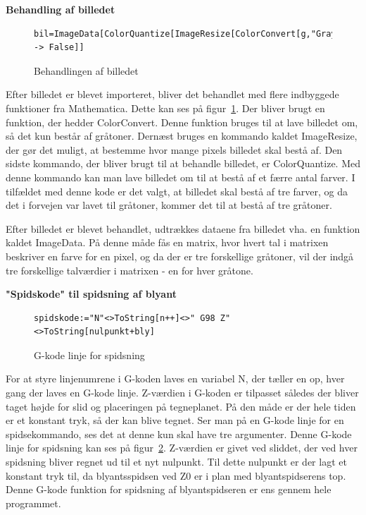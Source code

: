 \textbf{Behandling af billedet}\\
\begin{figure}[h]
	\begin{lstlisting}
bil=ImageData[ColorQuantize[ImageResize[ColorConvert[g,"Grayscale"],a],3,Dithering -> False]]
\end{lstlisting}
	\caption{Behandlingen af billedet}
	\label{fig:bil}
	\end{figure}
Efter billedet er blevet importeret, bliver det behandlet med flere indbyggede funktioner fra Mathematica. Dette kan ses på figur~\ref{fig:bil}. Der bliver brugt en funktion, der hedder ColorConvert. Denne funktion bruges til at lave billedet om, så det kun består af gråtoner. Dernæst bruges en kommando kaldet ImageResize, der gør det muligt, at bestemme hvor mange pixels billedet skal bestå af. Den sidste kommando, der bliver brugt til at behandle billedet, er ColorQuantize. Med denne kommando kan man lave billedet om til at bestå af et færre antal farver. I tilfældet med denne kode er det valgt, at billedet skal bestå af tre farver, og da det i forvejen var lavet til gråtoner, kommer det til at bestå af tre gråtoner.

Efter billedet er blevet behandlet, udtrækkes dataene fra billedet vha. en funktion kaldet ImageData. På denne måde fås en matrix, hvor hvert tal i matrixen beskriver en farve for en pixel, og da der er tre forskellige gråtoner, vil der indgå tre forskellige talværdier i matrixen - en for hver gråtone.

\textbf{"Spidskode" til spidsning af blyant}\\
\begin{figure}[h]
	\begin{lstlisting}
spidskode:="N"<>ToString[n++]<>" G98 Z"<>ToString[nulpunkt+bly]
 \end{lstlisting}
	\caption{G-kode linje for spidsning}
	\label{fig:spidskode}
	\end{figure}
For at styre linjenumrene i G-koden laves en variabel N, der tæller en op, hver gang der laves en G-kode linje. Z-værdien i G-koden er tilpasset således der bliver taget højde for slid og placeringen på tegneplanet. På den måde er der hele tiden er et konstant tryk, så der kan blive tegnet. Ser man på en G-kode linje for en spidsekommando, ses det at denne kun skal have tre argumenter. Denne G-kode linje for spidsning kan ses på figur~\ref{fig:spidskode}. Z-værdien er givet ved sliddet, der ved hver spidsning bliver regnet ud til et nyt nulpunkt. Til dette nulpunkt er der lagt et konstant tryk til, da blyantsspidsen ved Z0 er i plan med blyantspidserens top. Denne G-kode funktion for spidsning af blyantspidseren er ens gennem hele programmet. 

